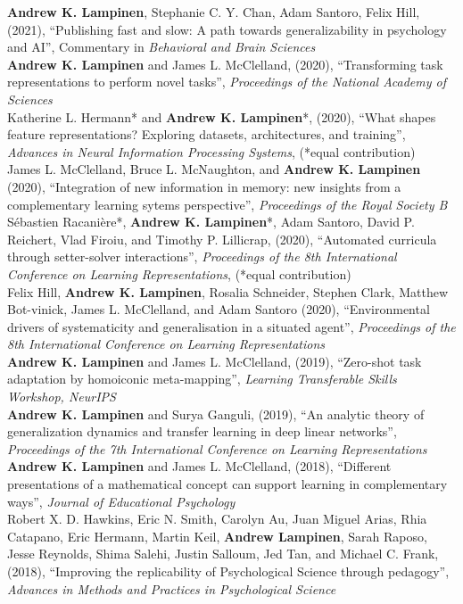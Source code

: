\documentclass[margin]{res}
\begin{document}
\begin{resume}
\textbf{Andrew K. Lampinen}, Stephanie C. Y. Chan, Adam Santoro, Felix Hill, (2021), {``Publishing fast and slow: A path towards generalizability in psychology and AI'',} Commentary in \textit{Behavioral and Brain Sciences} \\[3pt] 
\textbf{Andrew K. Lampinen} and James L. McClelland, (2020), {``Transforming task representations to perform novel tasks'',} \textit{Proceedings of the National Academy of Sciences} \\[3pt] 
Katherine L. Hermann* and \textbf{Andrew K. Lampinen}*, (2020), {``What shapes feature representations? Exploring datasets, architectures, and training'',} \textit{Advances in Neural Information Processing Systems}, (*equal contribution) \\[3pt] 
James L. McClelland, Bruce L. McNaughton, and \textbf{Andrew K. Lampinen} (2020), {``Integration of new information in memory: new insights from a complementary learning sytems perspective''}, \textit{Proceedings of the Royal Society B} \\[3pt]
S\'ebastien Racani\`ere*, \textbf{Andrew K. Lampinen}*, Adam Santoro, David P. Reichert, Vlad Firoiu, and Timothy P. Lillicrap, (2020), {``Automated curricula through setter-solver interactions'',} \textit{Proceedings of the 8th International Conference on Learning Representations}, (*equal contribution) \\ [3pt] 
Felix Hill, \textbf{Andrew K. Lampinen}, Rosalia Schneider, Stephen Clark, Matthew Bot-vinick, James L. McClelland, and Adam Santoro (2020), {``Environmental drivers of systematicity and generalisation in a situated agent'',} \textit{Proceedings of the 8th International Conference on Learning Representations} \\ [3pt] 
\textbf{Andrew K. Lampinen} and James L. McClelland, (2019), {``Zero-shot task adaptation by homoiconic meta-mapping'',} \textit{Learning Transferable Skills Workshop, NeurIPS} \\ [3pt] 
\textbf{Andrew K. Lampinen} and Surya Ganguli, (2019), {``An analytic theory of generalization dynamics and transfer learning in deep linear networks'',} \textit{Proceedings of the 7th International Conference on Learning Representations} \\[3pt] 
\textbf{Andrew K. Lampinen} and James L. McClelland, (2018), {``Different presentations of a mathematical concept can support learning in complementary ways'',} \textit{Journal of Educational Psychology} \\[3pt]
 Robert X. D. Hawkins, Eric N. Smith, Carolyn Au, Juan Miguel Arias, Rhia Catapano, Eric Hermann, Martin Keil, \textbf{Andrew Lampinen}, Sarah Raposo, Jesse Reynolds, Shima Salehi, Justin Salloum, Jed Tan, and Michael C. Frank, (2018), {``Improving the replicability of Psychological Science through pedagogy'',}  \textit{Advances in Methods and Practices in Psychological Science} \\ [3pt]

\end{resume}
\end{document}
